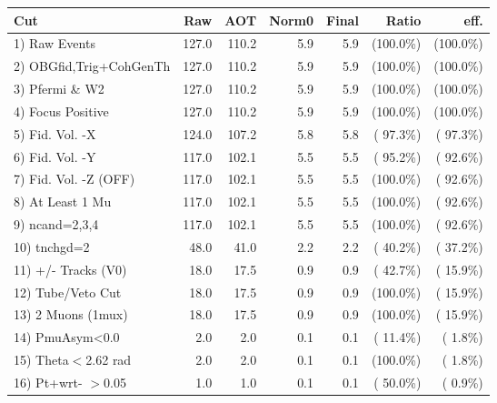  \begin{table}[h!]\centering
 \begin{tabular}{||l||r|r|r|r|r|r||}
 \hline
 \hline
 Cut & Raw & AOT & Norm0 & Final & Ratio & eff.       \\
 \hline
  1) Raw Events           &        127.0 &        110.2 &          5.9 &          5.9 & (100.0\%) & (100.0\%) \\
  2) OBGfid,Trig+CohGenTh &        127.0 &        110.2 &          5.9 &          5.9 & (100.0\%) & (100.0\%) \\
  3) Pfermi \& W2         &        127.0 &        110.2 &          5.9 &          5.9 & (100.0\%) & (100.0\%) \\
  4) Focus Positive       &        127.0 &        110.2 &          5.9 &          5.9 & (100.0\%) & (100.0\%) \\
  5) Fid. Vol. -X         &        124.0 &        107.2 &          5.8 &          5.8 & ( 97.3\%) & ( 97.3\%) \\
  6) Fid. Vol. -Y         &        117.0 &        102.1 &          5.5 &          5.5 & ( 95.2\%) & ( 92.6\%) \\
  7) Fid. Vol. -Z (OFF)   &        117.0 &        102.1 &          5.5 &          5.5 & (100.0\%) & ( 92.6\%) \\
  8) At Least 1 Mu        &        117.0 &        102.1 &          5.5 &          5.5 & (100.0\%) & ( 92.6\%) \\
  9) ncand=2,3,4          &        117.0 &        102.1 &          5.5 &          5.5 & (100.0\%) & ( 92.6\%) \\
 10) tnchgd=2             &         48.0 &         41.0 &          2.2 &          2.2 & ( 40.2\%) & ( 37.2\%) \\
 11) +/- Tracks (V0)      &         18.0 &         17.5 &          0.9 &          0.9 & ( 42.7\%) & ( 15.9\%) \\
 12) Tube/Veto Cut        &         18.0 &         17.5 &          0.9 &          0.9 & (100.0\%) & ( 15.9\%) \\
 13) 2 Muons (1mux)       &         18.0 &         17.5 &          0.9 &          0.9 & (100.0\%) & ( 15.9\%) \\
 14) PmuAsym<0.0          &          2.0 &          2.0 &          0.1 &          0.1 & ( 11.4\%) & (  1.8\%) \\
 15) Theta$<$2.62 rad     &          2.0 &          2.0 &          0.1 &          0.1 & (100.0\%) & (  1.8\%) \\
 16) Pt+wrt- $>$0.05      &          1.0 &          1.0 &          0.1 &          0.1 & ( 50.0\%) & (  0.9\%) \\

\end{tabular}
\end{table}
